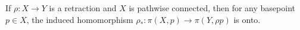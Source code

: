 If $\rho: X \to Y$ is a retraction and $X$ is pathwise connected, then for any basepoint $p \in X$, the induced homomorphism $\rho_*: \pi(X,p) \to \pi(Y,\rho p)$ is onto.
